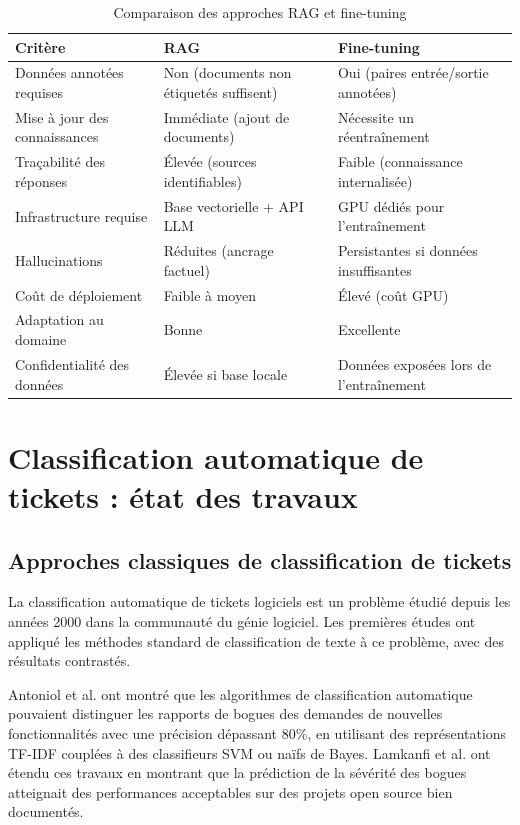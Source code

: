 \begin{table}[h!]
\centering
\begin{tabularx}{\textwidth}{|l|X|X|}
  \hline
  \textbf{Critère} & \textbf{RAG} & \textbf{Fine-tuning} \\
  \hline
  Données annotées requises & Non (documents non étiquetés suffisent) & Oui (paires entrée/sortie annotées) \\
  \hline
  Mise à jour des connaissances & Immédiate (ajout de documents) & Nécessite un réentraînement \\
  \hline
  Traçabilité des réponses & Élevée (sources identifiables) & Faible (connaissance internalisée) \\
  \hline
  Infrastructure requise & Base vectorielle + API LLM & GPU dédiés pour l'entraînement \\
  \hline
  Hallucinations & Réduites (ancrage factuel) & Persistantes si données insuffisantes \\
  \hline
  Coût de déploiement & Faible à moyen & Élevé (coût GPU) \\
  \hline
  Adaptation au domaine & Bonne & Excellente \\
  \hline
  Confidentialité des données & Élevée si base locale & Données exposées lors de l'entraînement \\
  \hline
\end{tabularx}
\caption{Comparaison des approches RAG et fine-tuning}
\label{tab:rag_vs_finetune}
\end{table}

\section{Classification automatique de tickets : état des travaux}

\subsection{Approches classiques de classification de tickets}

La classification automatique de tickets logiciels est un problème étudié depuis les années 2000 dans la communauté du génie logiciel. Les premières études ont appliqué les méthodes standard de classification de texte à ce problème, avec des résultats contrastés.

Antoniol et al. \cite{logo:antoniol2008} ont montré que les algorithmes de classification automatique pouvaient distinguer les rapports de bogues des demandes de nouvelles fonctionnalités avec une précision dépassant 80\%, en utilisant des représentations TF-IDF couplées à des classifieurs SVM ou naïfs de Bayes. Lamkanfi et al. \cite{logo:lamkanfi2010} ont étendu ces travaux en montrant que la prédiction de la sévérité des bogues atteignait des performances acceptables sur des projets open source bien documentés.

